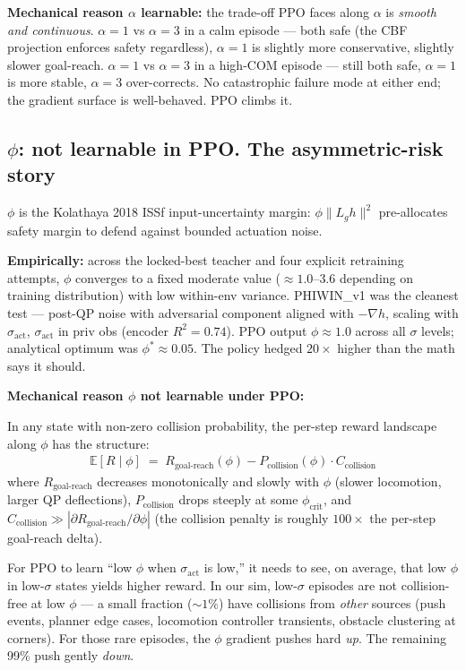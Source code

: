 \documentclass[11pt]{article}
\begin{document}
\textbf{Mechanical reason $\alpha$ learnable:} the trade-off PPO faces along $\alpha$ is \emph{smooth and continuous}. $\alpha = 1$ vs $\alpha = 3$ in a calm episode --- both safe (the CBF projection enforces safety regardless), $\alpha = 1$ is slightly more conservative, slightly slower goal-reach. $\alpha = 1$ vs $\alpha = 3$ in a high-COM episode --- still both safe, $\alpha = 1$ is more stable, $\alpha = 3$ over-corrects. No catastrophic failure mode at either end; the gradient surface is well-behaved. PPO climbs it.

\subsection*{$\phi$: not learnable in PPO. The asymmetric-risk story}

$\phi$ is the Kolathaya 2018 ISSf input-uncertainty margin: $\phi \|L_g h\|^2$ pre-allocates safety margin to defend against bounded actuation noise.

\textbf{Empirically:} across the locked-best teacher and four explicit retraining attempts, $\phi$ converges to a fixed moderate value ($\approx 1.0$--$3.6$ depending on training distribution) with low within-env variance. PHIWIN\_v1 was the cleanest test --- post-QP noise with adversarial component aligned with $-\nabla h$, scaling with $\sigma_\text{act}$, $\sigma_\text{act}$ in priv obs (encoder $R^2 = 0.74$). PPO output $\phi \approx 1.0$ across all $\sigma$ levels; analytical optimum was $\phi^* \approx 0.05$. The policy hedged $20\times$ higher than the math says it should.

\textbf{Mechanical reason $\phi$ not learnable under PPO:}

In any state with non-zero collision probability, the per-step reward landscape along $\phi$ has the structure:
\begin{align*}
\mathbb{E}[R \mid \phi] \;=\; R_\text{goal-reach}(\phi) - P_\text{collision}(\phi) \cdot C_\text{collision}
\end{align*}
where $R_\text{goal-reach}$ decreases monotonically and slowly with $\phi$ (slower locomotion, larger QP deflections), $P_\text{collision}$ drops steeply at some $\phi_\text{crit}$, and $C_\text{collision} \gg |\partial R_\text{goal-reach}/\partial \phi|$ (the collision penalty is roughly $100\times$ the per-step goal-reach delta).

For PPO to learn ``low $\phi$ when $\sigma_\text{act}$ is low,'' it needs to see, on average, that low $\phi$ in low-$\sigma$ states yields higher reward. In our sim, low-$\sigma$ episodes are not collision-free at low $\phi$ --- a small fraction ($\sim 1\%$) have collisions from \emph{other} sources (push events, planner edge cases, locomotion controller transients, obstacle clustering at corners). For those rare episodes, the $\phi$ gradient pushes hard \emph{up}. The remaining 99\% push gently \emph{down}.
\end{document}
